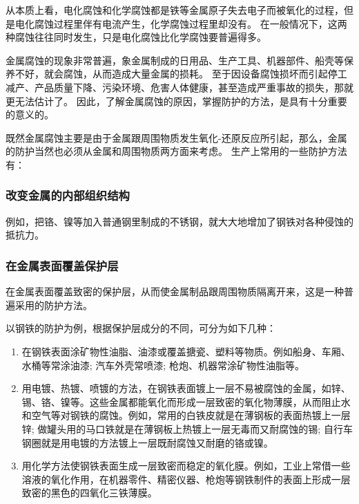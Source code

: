 从本质上看，电化腐蚀和化学腐蚀都是铁等金属原子失去电子而被氧化的过程，但是电化腐蚀过程里伴有电流产生，化学腐蚀过程里却没有。
在一般情况下，这两种腐蚀往往同时发生，只是电化腐蚀比化学腐蚀要普遍得多。

金属腐蚀的现象非常普遍，象金属制成的日用品、生产工具、机器部件、船壳等保养不好，就会腐蚀，从而造成大量金属的损耗。
至于因设备腐蚀损坏而引起停工减产、产品质量下降、污染环境、危害人体健康，甚至造成严重事故的损失，那就更无法估计了。
因此，了解金属腐蚀的原因，掌握防护的方法，是具有十分重要的意义的。

既然金属腐蚀主要是由于金属跟周围物质发生氧化-还原反应所引起，那么，金属的防护当然也必须从金属和周围物质两方面来考虑。
生产上常用的一些防护方法有：
\subsubsection{改变金属的内部组织结构}
例如，把铬、镍等加入普通钢里制成的不锈钢，就大大地增加了钢铁对各种侵蚀的抵抗力。

\subsubsection{在金属表面覆盖保护层}
在金属表面覆盖致密的保护层，从而使金属制品跟周围物质隔离开来，这是一种普遍采用的防护方法。

\begin{Reading}[补充阅读]{}
以钢铁的防护为例，根据保护层成分的不同，可分为如下几种：
\begin{enumerate}
  \item 在钢铁表面涂矿物性油脂、油漆或覆盖搪瓷、塑料等物质。例如船身、车厢、水桶等常涂油漆; 汽车外壳常喷漆; 枪炮、机器常涂矿物性油脂等。
  \item 用电镀、热镀、喷镀的方法，在钢铁表面镀上一层不易被腐蚀的金属，如锌、锡、铬、镍等。这些金属都能氧化而形成一层致密的氧化物薄膜，从而阻止水和空气等对钢铁的腐蚀。例如，常用的白铁皮就是在薄钢板的表面热镀上一层锌; 做罐头用的马口铁就是在薄钢板上热镀上一层无毒而又耐腐蚀的锡; 自行车钢圈就是用电镀的方法镀上一层既耐腐蚀又耐磨的铬或镍。
  \item 用化学方法使钢铁表面生成一层致密而稳定的氧化膜。例如，工业上常借一些溶液的氧化作用，在机器零件、精密仪器、枪炮等钢铁制件的表面上形成一层致密的黑色的四氧化三铁薄膜。
\end{enumerate}
\end{Reading}

